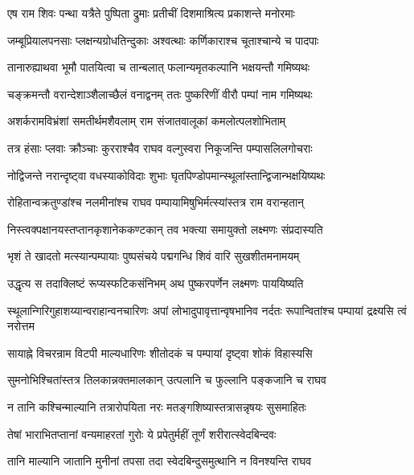 \twolineshloka
{एष राम शिवः पन्था यत्रैते पुष्पिता द्रुमाः}
{प्रतीचीं दिशमाश्रित्य प्रकाशन्ते मनोरमाः} %

\twolineshloka
{जम्बूप्रियालपनसाः प्लक्षन्यग्रोधतिन्दुकाः}
{अश्वत्थाः कर्णिकाराश्च चूताश्चान्ये च पादपाः} %

\twolineshloka
{तानारुह्याथवा भूमौ पातयित्वा च तान्बलात्}
{फलान्यमृतकल्पानि भक्षयन्तौ गमिष्यथः} %

\twolineshloka
{चङ्क्रमन्तौ वरान्देशाञ्शैलाच्छैलं वनाद्वनम्}
{ततः पुष्करिणीं वीरौ पम्पां नाम गमिष्यथः} %

\twolineshloka
{अशर्करामविभ्रंशां समतीर्थमशैवलाम्}
{राम संजातवालूकां कमलोत्पलशोभिताम्} %

\twolineshloka
{तत्र हंसाः प्लवाः क्रौञ्चाः कुरराश्चैव राघव}
{वल्गुस्वरा निकूजन्ति पम्पासलिलगोचराः} %

\twolineshloka
{नोद्विजन्ते नरान्दृष्ट्वा वधस्याकोविदाः शुभाः}
{घृतपिण्डोपमान्स्थूलांस्तान्द्विजान्भक्षयिष्यथः} %

\twolineshloka
{रोहितान्वक्रतुण्डांश्च नलमीनांश्च राघव}
{पम्पायामिषुभिर्मत्स्यांस्तत्र राम वरान्हतान्} %

\twolineshloka
{निस्त्वक्पक्षानयस्तप्तानकृशानेककण्टकान्}
{तव भक्त्या समायुक्तो लक्ष्मणः संप्रदास्यति} %

\twolineshloka
{भृशं ते खादतो मत्स्यान्पम्पायाः पुष्पसंचये}
{पद्मगन्धि शिवं वारि सुखशीतमनामयम्} %

\twolineshloka
{उद्धृत्य स तदाक्लिष्टं रूप्यस्फटिकसंनिभम्}
{अथ पुष्करपर्णेन लक्ष्मणः पाययिष्यति} %

\threelineshloka
{स्थूलान्गिरिगुहाशय्यान्वराहान्वनचारिणः}
{अपां लोभादुपावृत्तान्वृषभानिव नर्दतः}
{रूपान्वितांश्च पम्पायां द्रक्ष्यसि त्वं नरोत्तम} %

\twolineshloka
{सायाह्ने विचरन्राम विटपी माल्यधारिणः}
{शीतोदकं च पम्पायां दृष्ट्वा शोकं विहास्यसि} %

\twolineshloka
{सुमनोभिश्चितांस्तत्र तिलकान्नक्तमालकान्}
{उत्पलानि च फुल्लानि पङ्कजानि च राघव} %

\twolineshloka
{न तानि कश्चिन्माल्यानि तत्रारोपयिता नरः}
{मतङ्गशिष्यास्तत्रासन्नृषयः सुसमाहितः} %

\twolineshloka
{तेषां भाराभितप्तानां वन्यमाहरतां गुरोः}
{ये प्रपेतुर्महीं तूर्णं शरीरात्स्वेदबिन्दवः} %

\twolineshloka
{तानि माल्यानि जातानि मुनीनां तपसा तदा}
{स्वेदबिन्दुसमुत्थानि न विनश्यन्ति राघव} %

